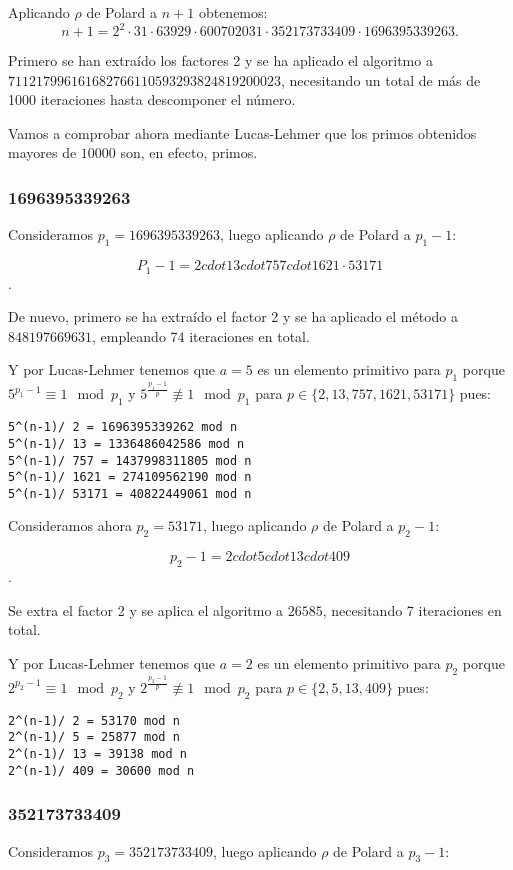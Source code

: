 \documentclass[a4paper]{article}
\begin{document}
Aplicando $\rho$ de Polard a $n+1$ obtenemos:
$$n+1 = 2^2\cdot 31 \cdot 63929\cdot 600702031\cdot 352173733409\cdot 1696395339263.$$

Primero se han extraído los factores 2 y se ha aplicado el algoritmo a $711217996161682766110593293824819200023$, necesitando un total de más de 1000 iteraciones hasta descomponer el número.

Vamos a comprobar ahora mediante Lucas-Lehmer que los primos obtenidos mayores de $10000$ son, en efecto, primos.

\subsubsection{1696395339263}
Consideramos $p_1=1696395339263$, luego aplicando $\rho$ de Polard a $p_1-1$:

$$P_1-1=2 cdot 13 cdot 757 cdot 1621 \cdot 53171$$.

De nuevo, primero se ha extraído el factor 2 y se ha aplicado el método a $848197669631$, empleando 74 iteraciones en total.

Y por Lucas-Lehmer tenemos que $a=5$ es un elemento primitivo para $p_1$ porque $5^{p_1-1}\equiv 1\mod p_1$ y $5^{\frac{p_1-1}{p}}\not\equiv 1\mod p_1 $ para $p\in\{2, 13, 757, 1621, 53171\}$ pues:

\begin{verbatim}
5^(n-1)/ 2 = 1696395339262 mod n
5^(n-1)/ 13 = 1336486042586 mod n
5^(n-1)/ 757 = 1437998311805 mod n
5^(n-1)/ 1621 = 274109562190 mod n
5^(n-1)/ 53171 = 40822449061 mod n
\end{verbatim}

Consideramos ahora $p_2=53171$, luego aplicando $\rho$ de Polard a $p_2-1$:

$$p_2-1=2 cdot 5 cdot 13 cdot 409$$.

Se extra el factor 2 y se aplica el algoritmo a $26585$, necesitando 7 iteraciones en total.

Y por Lucas-Lehmer tenemos que $a=2$ es un elemento primitivo para $p_2$ porque $2^{p_2-1}\equiv 1\mod p_2$ y $2^{\frac{p_2-1}{p}}\not\equiv 1\mod p_2 $ para $p\in\{2, 5, 13, 409\}$ pues:

\begin{verbatim}
2^(n-1)/ 2 = 53170 mod n
2^(n-1)/ 5 = 25877 mod n
2^(n-1)/ 13 = 39138 mod n
2^(n-1)/ 409 = 30600 mod n
\end{verbatim}

\subsubsection{352173733409}
Consideramos $p_3=352173733409$, luego aplicando $\rho$ de Polard a $p_3-1$:
\end{document}
